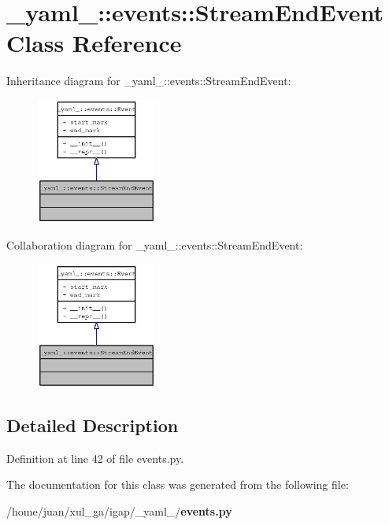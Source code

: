 \section{\_\-yaml\_\-::events::StreamEndEvent Class Reference}
\label{class__yaml___1_1events_1_1StreamEndEvent}
Inheritance diagram for \_\-yaml\_\-::events::StreamEndEvent:\nopagebreak
\begin{figure}[H]
\begin{center}
\leavevmode
\includegraphics[width=112pt]{class__yaml___1_1events_1_1StreamEndEvent__inherit__graph}
\end{center}
\end{figure}
Collaboration diagram for \_\-yaml\_\-::events::StreamEndEvent:\nopagebreak
\begin{figure}[H]
\begin{center}
\leavevmode
\includegraphics[width=112pt]{class__yaml___1_1events_1_1StreamEndEvent__coll__graph}
\end{center}
\end{figure}


\subsection{Detailed Description}


Definition at line 42 of file events.py.

The documentation for this class was generated from the following file:\begin{CompactItemize}
\item 
/home/juan/xul\_\-ga/igap/\_\-yaml\_\-/{\bf events.py}\end{CompactItemize}
